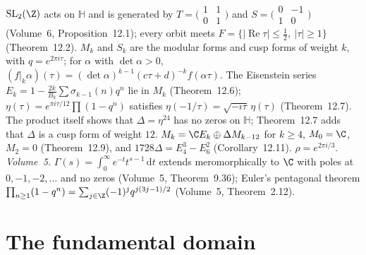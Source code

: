 \begin{reminder}
$\mathrm{SL}_2(\Z)$ acts on $\mathbb H$ and is generated by $T=\bigl(\begin{smallmatrix}1&1\\0&1\end{smallmatrix}\bigr)$ and $S=\bigl(\begin{smallmatrix}0&-1\\1&0\end{smallmatrix}\bigr)$
(Volume~6, Proposition~12.1); every orbit meets $F=\{|\operatorname{Re}\tau|\le\frac12,\ |\tau|\ge1\}$ (Theorem~12.2). $M_k$ and $S_k$ are the modular forms and cusp
forms of weight $k$, with $q=e^{2\pi i\tau}$; for $\alpha$ with $\det\alpha>0$, $(f|_k\alpha)(\tau)=(\det\alpha)^{k-1}(c\tau+d)^{-k}f(\alpha\tau)$. The Eisenstein series
$E_k=1-\frac{2k}{B_k}\sum\sigma_{k-1}(n)q^n$ lie in $M_k$ (Theorem~12.6); $\eta(\tau)=e^{\pi i\tau/12}\prod(1-q^n)$ satisfies $\eta(-1/\tau)=\sqrt{-i\tau}\,\eta(\tau)$ (Theorem~12.7). The product itself shows that $\Delta=\eta^{24}$ has no zeros on $\mathbb H$; Theorem~12.7 adds that $\Delta$ is a cusp form of weight $12$. $M_k=\C E_k\oplus\Delta M_{k-12}$ for $k\ge4$, $M_0=\C$, $M_2=0$ (Theorem~12.9), and
$1728\Delta=E_4^3-E_6^2$ (Corollary~12.11). $\rho=e^{2\pi i/3}$. \emph{Volume~5.} $\Gamma(s)=\int_0^\infty e^{-t}t^{s-1}\,\mathrm dt$ extends meromorphically to $\C$ with poles at
$0,-1,-2,\dots$ and no zeros (Volume~5, Theorem~9.36); Euler's pentagonal theorem $\prod_{n\ge1}(1-q^n)=\sum_{j\in\Z}(-1)^jq^{j(3j-1)/2}$ (Volume~5, Theorem~2.12).
\end{reminder}

\section{The fundamental domain}

